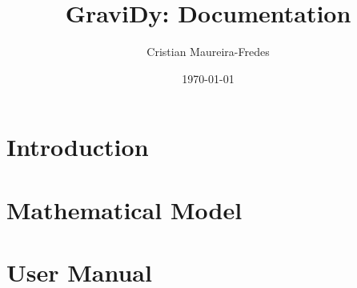 \documentclass[a4paper]{report}
\title{{\sc GraviDy}: Documentation}
\author{Cristian Maureira-Fredes}
\date{\today}
\begin{document}
\maketitle

\section{Introduction}
\section{Mathematical Model}
\section{User Manual}
\end{document}
